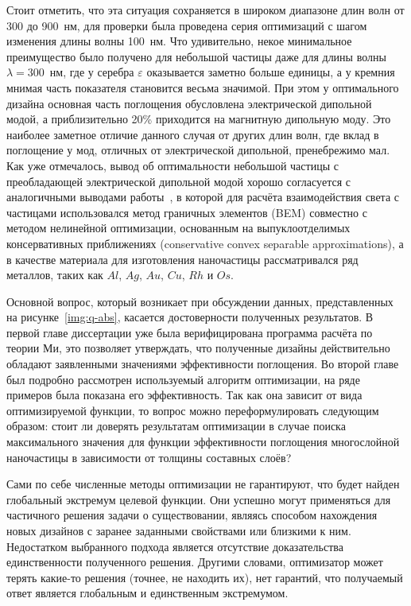 Стоит отметить, что эта ситуация сохраняется в широком диапазоне длин
волн от 300 до 900~нм, для проверки была проведена серия оптимизаций с
шагом изменения длины волны 100~нм.  Что удивительно, некое
минимальное преимущество было получено для небольшой частицы даже для
длины волны $\lambda=300$~нм, где у серебра $\varepsilon$ оказывается
заметно больше единицы, а у кремния мнимая часть показателя становится
весьма значимой. При этом у оптимального дизайна основная часть поглощения
обусловлена электрической дипольной модой, а приблизительно 20\%
приходится на магнитную дипольную моду. Это наиболее заметное отличие
данного случая от других длин волн, где вклад в поглощение у мод,
отличных от электрической дипольной, пренебрежимо мал. Как уже
отмечалось, вывод об оптимальности небольшой частицы с преобладающей
электрической дипольной модой хорошо согласуется с аналогичными
выводами работы~\cite{Miller-2014}, в которой для расчёта
взаимодействия света с частицами использовался метод граничных
элементов (BEM) совместно с методом нелинейной оптимизации, основанным
на выпуклоотделимых консервативных приближениях (conservative convex
separable approximations), а в качестве материала для изготовления
наночастицы рассматривался ряд металлов, таких как $Al$, $Ag$, $Au$,
$Cu$, $Rh$ и $Os$.


Основной вопрос, который возникает при обсуждении данных,
представленных на рисунке~\ref{img:q-abs}, касается достоверности
полученных результатов.  В первой главе диссертации уже была
верифицирована программа расчёта по теории Ми, это позволяет
утверждать, что полученные дизайны действительно обладают заявленными
значениями эффективности поглощения.  Во второй главе был подробно
рассмотрен используемый алгоритм оптимизации, на ряде примеров была
показана его эффективность.  Так как она зависит от вида
оптимизируемой функции, то вопрос можно переформулировать следующим
образом: стоит ли доверять результатам оптимизации в случае
поиска максимального значения для функции эффективности поглощения
многослойной наночастицы в зависимости от толщины составных слоёв?

Сами по себе численные методы оптимизации не гарантируют, что
будет найден глобальный экстремум целевой функции. Они успешно
могут применяться для частичного решения задачи о существовании,
являясь способом нахождения новых дизайнов с заранее заданными
свойствами или близкими к ним.  Недостатком выбранного подхода является
отсутствие доказательства единственности полученного решения.  Другими
словами, оптимизатор может терять какие-то решения (точнее, не
находить их), нет гарантий, что получаемый ответ является глобальным и
единственным экстремумом.

